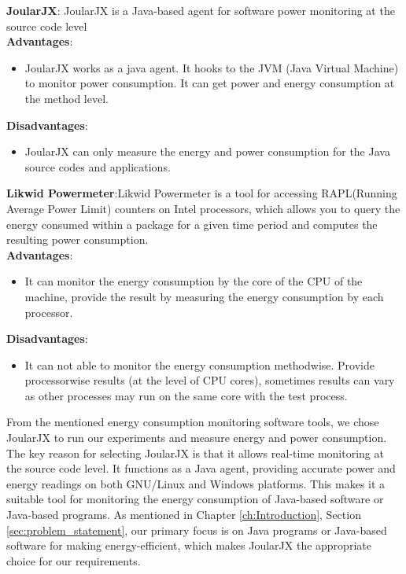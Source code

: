 \textbf{JoularJX}: JoularJX is a Java-based agent for software power monitoring at the source code level\\

\textbf{Advantages}:
\begin{itemize}
    \renewcommand\labelitemi{}
    \item JoularJX works as a java agent. It hooks to the JVM (Java Virtual Machine) to monitor power consumption. It can get power and energy consumption at the method level.
\end{itemize}

\textbf{Disadvantages}:
\begin{itemize}
    \renewcommand\labelitemi{}
    \item JoularJX can only measure the energy and power consumption for the Java source codes and applications.
\end{itemize}

\textbf{Likwid Powermeter}:Likwid Powermeter is a
tool for accessing RAPL(Running Average Power Limit) counters on Intel processors, which allows you to query the energy consumed within a package for a given time period and computes the resulting power consumption.\\

\textbf{Advantages}:
\begin{itemize}
    \renewcommand\labelitemi{}
    \item It can monitor the energy consumption by the core of the CPU of the machine, provide the result by measuring the energy consumption by each processor.
\end{itemize}

\textbf{Disadvantages}:
\begin{itemize}
    \renewcommand\labelitemi{}
    \item It can not able to monitor the energy consumption methodwise. Provide processorwise results (at the level of CPU cores), sometimes results can vary as other processes may run on the same core with the test process.
\end{itemize}

\vspace{.5em}
From the mentioned energy consumption monitoring software tools, we chose JoularJX to run our experiments and measure energy and power consumption. The key reason for selecting JoularJX is that it allows real-time monitoring at the source code level. It functions as a Java agent, providing accurate power and energy readings on both GNU/Linux and Windows platforms. This makes it a suitable tool for monitoring the energy consumption of Java-based software or Java-based programs. As mentioned in Chapter \ref{ch:Introduction}, Section \ref{sec:problem_statement}, our primary focus is on Java programs or Java-based software for making energy-efficient, which makes JoularJX the appropriate choice for our requirements.


